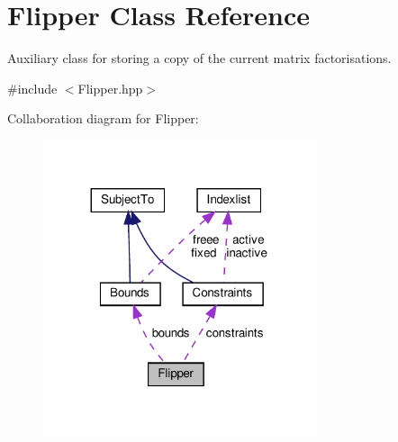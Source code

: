 \hypertarget{class_flipper}{}\section{Flipper Class Reference}
\label{class_flipper}


Auxiliary class for storing a copy of the current matrix factorisations.  




{\ttfamily \#include $<$Flipper.\+hpp$>$}



Collaboration diagram for Flipper\+:
\nopagebreak
\begin{figure}[H]
\begin{center}
\leavevmode
\includegraphics[width=227pt]{class_flipper__coll__graph}
\end{center}
\end{figure}
